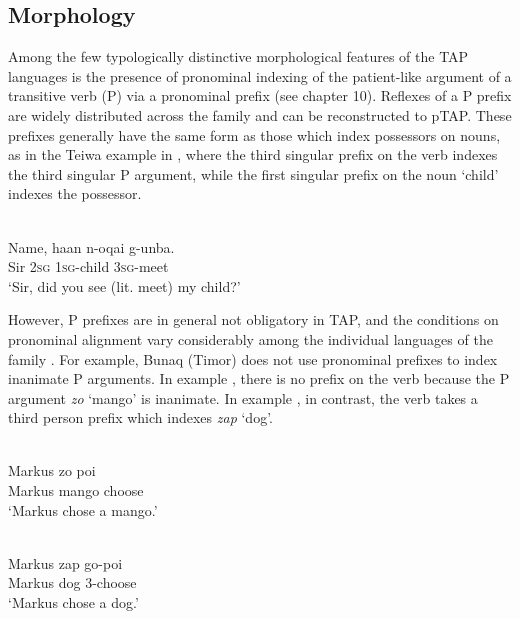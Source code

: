 \subsection{Morphology} \label{sec:4:2.2}
Among the few typologically distinctive morphological features of the TAP languages is the presence of pronominal indexing of the patient-like argument of a transitive verb (P) via a pronominal prefix (see chapter 10). Reflexes of a P prefix are widely distributed across the family and can be reconstructed to pTAP. These prefixes generally have the same form as those which index possessors on nouns, as in the Teiwa example in , where the third singular prefix on the verb indexes the third singular P argument, while the first singular prefix on the noun `child' indexes the possessor.

\ea%
\label{ex:4:1}
 \\
\gll  Name, ha{\textglotstop}an n-oqai g-unba{\textglotstop}. \\
  Sir \textsc{2sg} \textsc{1sg}-child \textsc{3sg}-meet  \\
\glt `Sir, did you see (lit. meet) my child?'
\z




However, P prefixes are in general not obligatory in TAP, and the conditions on pronominal alignment vary considerably among the individual languages of the family \citep[chapter 10]{FeddenEtAl2013}. For example, Bunaq (Timor) does not use pronominal prefixes to index inanimate P arguments. In example , there is no prefix on the verb because the P argument \textit{zo} `mango' is inanimate. In example , in contrast, the verb takes a third person prefix which indexes \textit{zap} `dog'.

\ea%
\label{ex:4:2}
 \\
\gll  Markus zo poi \\
   Markus mango  choose \\
\glt `Markus chose a mango.'
\z





\ea%
\label{ex:4:3}
 \\
\gll  Markus zap go-poi \\
    Markus dog \textsc{3}-choose\\
\glt `Markus chose a dog.'
\z




